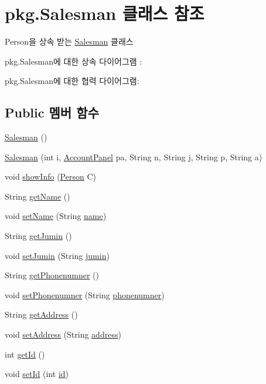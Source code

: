 \hypertarget{classpkg_1_1_salesman}{}\section{pkg.\+Salesman 클래스 참조}
\label{classpkg_1_1_salesman}


Person을 상속 받는 \hyperlink{classpkg_1_1_salesman}{Salesman} 클래스  




pkg.\+Salesman에 대한 상속 다이어그램 \+: 


pkg.\+Salesman에 대한 협력 다이어그램\+:
\subsection*{Public 멤버 함수}
\begin{DoxyCompactItemize}
\item 
\hyperlink{classpkg_1_1_salesman_ac0ff68982c4f6a9a8e2326150bc963a4}{Salesman} ()
\item 
\hyperlink{classpkg_1_1_salesman_a3dc67478874675dda1059d06c34288b3}{Salesman} (int i, \hyperlink{classpkg_1_1_account_panel}{Account\+Panel} pa, String n, String j, String p, String a)
\item 
void \hyperlink{classpkg_1_1_salesman_a75c42430eaad45e9b26ab17ffeacb665}{show\+Info} (\hyperlink{classpkg_1_1_person}{Person} C)
\item 
String \hyperlink{classpkg_1_1_person_ab524891b4990ebc4792ee2b8ad7748df}{get\+Name} ()
\item 
void \hyperlink{classpkg_1_1_person_ae7d5ce841c73e816d0f6751c8a7c0b22}{set\+Name} (String \hyperlink{classpkg_1_1_person_a37fd1fe3cf039df98ffca54df6002bb6}{name})
\item 
String \hyperlink{classpkg_1_1_person_aae5ac75c9dd518c4f88b2bcdb51c11d1}{get\+Jumin} ()
\item 
void \hyperlink{classpkg_1_1_person_ab1124c006fbc8ce0e0b9daab2c8422bd}{set\+Jumin} (String \hyperlink{classpkg_1_1_person_aef72766ac67a0af8074b513d00c523f8}{jumin})
\item 
String \hyperlink{classpkg_1_1_person_ad385ada4f1bfde67bbc9fbe8681277f0}{get\+Phonenumner} ()
\item 
void \hyperlink{classpkg_1_1_person_ab2ab58ad8afdb5edaa73ee57b63b657d}{set\+Phonenumner} (String \hyperlink{classpkg_1_1_person_aa7a67349f91a08a8cc45067354653c1d}{phonenumner})
\item 
String \hyperlink{classpkg_1_1_person_a590b6e7e8f71c26f427bdbbd4594ffd1}{get\+Address} ()
\item 
void \hyperlink{classpkg_1_1_person_aa74c6a07ade9f2fb7d7fa02be6fcf391}{set\+Address} (String \hyperlink{classpkg_1_1_person_a692aadebf7edf808fbcbacbcaed07ef3}{address})
\item 
int \hyperlink{classpkg_1_1_person_a2da9408fa69eac5cd12efdbdf93b82ed}{get\+Id} ()
\item 
void \hyperlink{classpkg_1_1_person_ac3efab3a29aa4fabc4163f6d3c633906}{set\+Id} (int \hyperlink{classpkg_1_1_person_acd3bca96258af32adc1eca89b74222a6}{id})
\end{DoxyCompactItemize}
